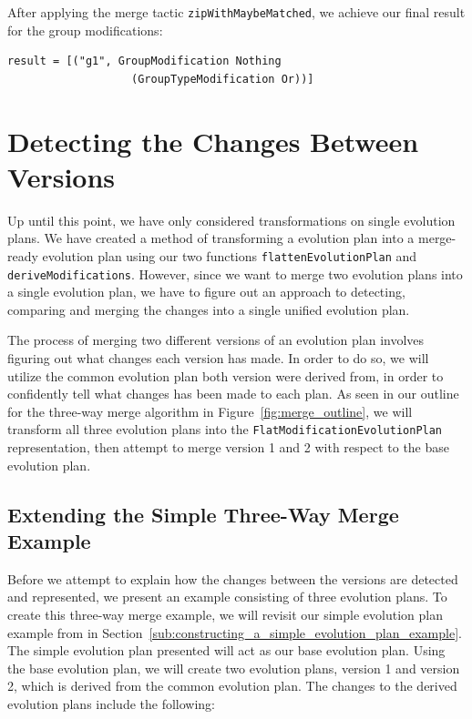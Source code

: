 \documentclass[a4paper,english]{ifimaster}
\begin{document}
After applying the merge tactic \texttt{zipWithMaybeMatched}, we achieve our final result for the group modifications:

\begin{verbatim}
result = [("g1", GroupModification Nothing 
                   (GroupTypeModification Or))]
\end{verbatim}

\section{Detecting the Changes Between Versions}%
\label{sec:detecting_the_changes_between_versions}

Up until this point, we have only considered transformations on single evolution plans. We have created a method of transforming a evolution plan into a merge-ready evolution plan using our two functions \texttt{flattenEvolutionPlan} and \texttt{deriveModifications}. However, since we want to merge two evolution plans into a single evolution plan, we have to figure out an approach to detecting, comparing and merging the changes into a single unified evolution plan.

The process of merging two different versions of an evolution plan involves figuring out what changes each version has made. In order to do so, we will utilize the common evolution plan both version were derived from, in order to confidently tell what changes has been made to each plan. As seen in our outline for the three-way merge algorithm in Figure~\vref{fig:merge_outline}, we will transform all three evolution plans into the \texttt{FlatModificationEvolutionPlan} representation, then attempt to merge version 1 and 2 with respect to the base evolution plan.

\subsection{Extending the Simple Three-Way Merge Example}%
\label{sub:extending_the_simple_three_way_merge_example}

Before we attempt to explain how the changes between the versions are detected and represented, we present an example consisting of three evolution plans. To create this three-way merge example, we will revisit our simple evolution plan example from in Section~\vref{sub:constructing_a_simple_evolution_plan_example}. The simple evolution plan presented will act as our base evolution plan. Using the base evolution plan, we will create two evolution plans, version 1 and version 2, which is derived from the common evolution plan. The changes to the derived evolution plans include the following:
\end{document}
